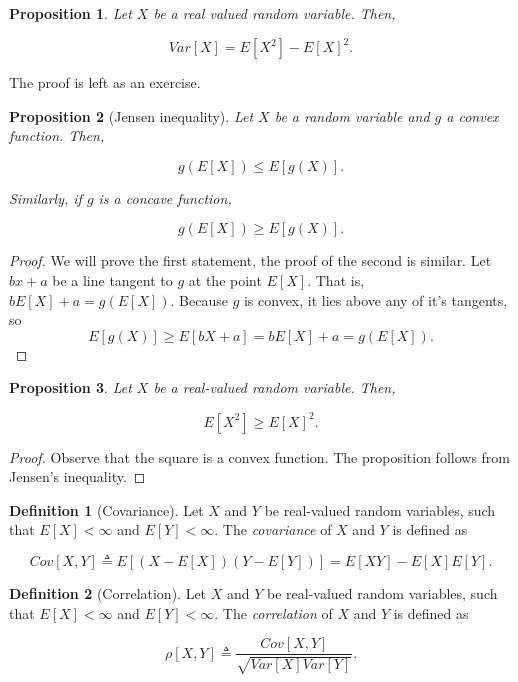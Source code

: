 \documentclass{book}
\theoremstyle{plain}%
\newtheorem{proposition}{Proposition}[section]
\theoremstyle{definition}
\newtheorem{definition}{Definition}[section]
\begin{document}
\begin{proposition}
Let $X$ be a real valued random variable. Then,

$$Var[X] = E[X^2] - E[X]^2.$$\label{prop:variance}
\end{proposition}

The proof is left as an exercise.

\begin{proposition}[Jensen inequality]
Let $X$ be a random variable and $g$ a convex function. Then,

$$g(E[X]) \leq E[g(X)].$$

Similarly, if $g$ is a concave function,

$$g(E[X]) \geq E[g(X)].$$

\end{proposition}

\begin{proof}
We will prove the first statement, the proof of the second is similar. Let $bx + a$ be a line tangent to $g$ at the point $E[X]$. That is, $bE[X] + a = g(E[X])$. Because $g$ is convex, it lies above any of it's tangents, so
$$E[g(X)] \geq E[bX + a] = bE[X] + a = g(E[X]).$$ 
\end{proof}


\begin{proposition}
Let $X$ be a real-valued random variable. Then, 

$$E[X^2] \geq E[X]^2.$$\label{prop:varsum}
\end{proposition}

\begin{proof}
Observe that the square is a convex function. The proposition follows from Jensen's inequality.
\end{proof}

\begin{definition}[Covariance] Let $X$ and $Y$ be real-valued random variables, such that $E[X] < \infty$ and $E[Y] < \infty$.  The \emph{covariance} of $X$ and $Y$ is defined as

$$Cov[X,Y] \triangleq E[(X - E[X])(Y - E[Y])] = E[XY] - E[X]E[Y].$$
\end{definition}

\begin{definition}[Correlation]
Let $X$ and $Y$ be real-valued random variables, such that $E[X] < \infty$ and $E[Y] < \infty$.  The \emph{correlation} of $X$ and $Y$ is defined as

$$\rho[X,Y] \triangleq \frac{Cov[X,Y]}{\sqrt{Var[X]Var[Y]}}.$$
\end{definition}
\end{document}
